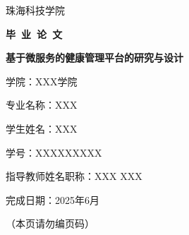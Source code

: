 \documentclass[12pt,a4paper]{article}
\begin{document}
\begin{titlepage}
\centering

\vspace{\baselineskip}            %
{\SimSun{} 珠海科技学院 \par}
\vspace{\baselineskip}            %


\vspace{1cm}                     %
{\SimSun{}\bfseries 毕\ 业\ 论\ 文 \par}
\vspace{1cm}                     %

\vspace{\baselineskip}            %
{\kaishu{}\bfseries 基于微服务的健康管理平台的研究与设计 \par}
\vspace{4\baselineskip}           %

\begin{flushleft}
{
学院：XXX学院 \par
专业名称：XXX \par
学生姓名：XXX \par
学号：XXXXXXXXX \par
指导教师姓名职称：XXX XXX \par
完成日期：2025年6月 \par
}
\end{flushleft}

\vfill
（本页请勿编页码）
\end{titlepage}





\clearpage
{}
\tableofcontents
\clearpage
{}


% 
% 
% 
% 
\end{document}

